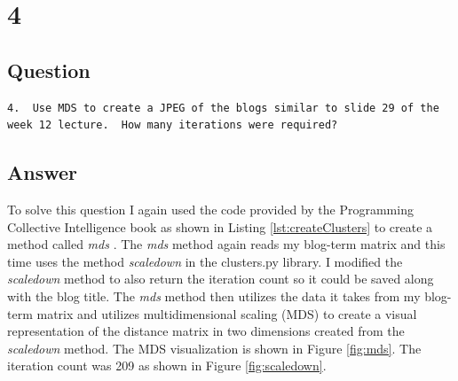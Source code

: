 \documentclass[letterpaper,11pt]{article}
\begin{document}
\clearpage


\section*{4}

\subsection*{Question}

\begin{verbatim}
4.  Use MDS to create a JPEG of the blogs similar to slide 29 of the 
week 12 lecture.  How many iterations were required?
\end{verbatim}

\subsection*{Answer}

To solve this question I again used the code provided by the Programming Collective Intelligence book as shown in Listing \ref{lst:createClusters} to create a method called \textit{mds} \cite{collectiveIntell}. The \textit{mds} method again reads my blog-term matrix and this time uses the method \textit{scaledown} in the clusters.py library. I modified the \textit{scaledown} method to also return the iteration count so it could be saved along with the blog title. The \textit{mds} method then utilizes the data it takes from my blog-term matrix and utilizes multidimensional scaling (MDS) to create a visual representation of the distance matrix in two dimensions created from the \textit{scaledown} method. The MDS visualization is shown in Figure \ref{fig:mds}. The iteration count was 209 as shown in Figure \ref{fig:scaledown}.
\end{document}
